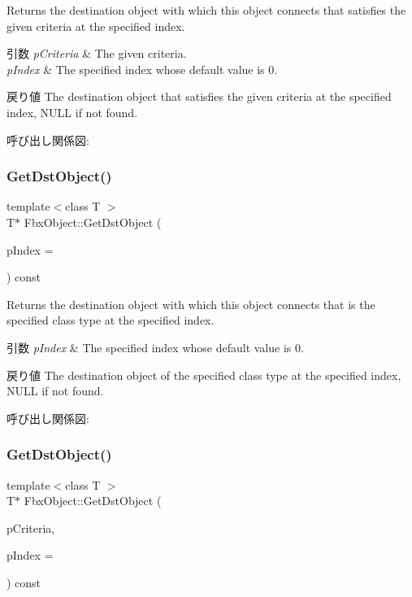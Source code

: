 Returns the destination object with which this object connects that satisfies the given criteria at the specified index. 
\begin{DoxyParams}{引数}
{\em p\+Criteria} & The given criteria. \\
\hline
{\em p\+Index} & The specified index whose default value is 0. \\
\hline
\end{DoxyParams}
\begin{DoxyReturn}{戻り値}
The destination object that satisfies the given criteria at the specified index, N\+U\+LL if not found. 
\end{DoxyReturn}
呼び出し関係図\+:
\mbox{\label{class_fbx_object_a07c0fb98b3aba9a646f5bbf849c0e6da}} 
\subsubsection{\texorpdfstring{Get\+Dst\+Object()}{GetDstObject()}\hspace{0.1cm}{\footnotesize\ttfamily [3/4]}}
{\footnotesize\ttfamily template$<$class T $>$ \\
T$\ast$ Fbx\+Object\+::\+Get\+Dst\+Object (\begin{DoxyParamCaption}\item[{int}]{p\+Index = {} }\end{DoxyParamCaption}) const}

Returns the destination object with which this object connects that is the specified class type at the specified index. 
\begin{DoxyParams}{引数}
{\em p\+Index} & The specified index whose default value is 0. \\
\hline
\end{DoxyParams}
\begin{DoxyReturn}{戻り値}
The destination object of the specified class type at the specified index, N\+U\+LL if not found. 
\end{DoxyReturn}
呼び出し関係図\+:
\mbox{\label{class_fbx_object_a4482176c100b07f3c4d7a0f20f2b04ff}} 
\subsubsection{\texorpdfstring{Get\+Dst\+Object()}{GetDstObject()}\hspace{0.1cm}{\footnotesize\ttfamily [4/4]}}
{\footnotesize\ttfamily template$<$class T $>$ \\
T$\ast$ Fbx\+Object\+::\+Get\+Dst\+Object (\begin{DoxyParamCaption}\item[{const \hyperlink{class_fbx_criteria}{Fbx\+Criteria} \&}]{p\+Criteria,  }\item[{int}]{p\+Index = {} }\end{DoxyParamCaption}) const}


